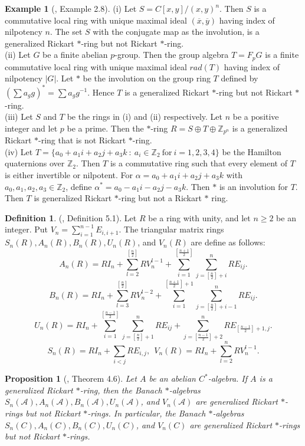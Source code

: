 \documentclass[11pt, one side,emlines]{amsart}
\newtheorem{proposition}[lemma]{Proposition}
\theoremstyle{definition}
\newtheorem{example}[lemma]{Example}
\newtheorem{definition}[lemma]{Definition}
\numberwithin{equation}{section} \thispagestyle{empty} \voffset
\begin{document}
 \begin{example} [\cite{ahmadigen2021}, Example 2.8]
 	(i) Let $S = C[x, y]/(x, y)^n$. Then $S$ is a commutative local ring with unique maximal ideal $(\overline x, \overline y)$
 	having index of nilpotency $n$. The set $S$ with the conjugate map as the involution, is a generalized Rickart $*$-ring but not Rickart $*$-ring.\\
 	(ii) Let $G$ be a finite abelian $p$-group. Then the group algebra $T = F_pG$ is a finite commutative local
 	ring with unique maximal ideal $rad(T)$ having index of nilpotency $|G|$. Let $*$ be the involution on the group ring $T$ defined by $(\sum a_gg)^* = \sum a_gg^{-1}$. Hence $T$ is a generalized Rickart $*$-ring but not Rickart $*$-ring.\\
 	(iii) Let $S$ and $T$ be the rings in (i) and (ii) respectively. Let $n$ be a positive integer and let $p$ be 	a prime. Then the $*$-ring $R = S \oplus T \oplus \mathbb Z_{p^n}$ is a generalized Rickart $*$-ring that is not Rickart $*$-ring.\\
 	(iv) Let $T=\{a_0+a_1i+a_2j+a_3k ~:~ a_i\in \mathbb Z_2~\text{for}~ i=1,2,3,4\}$ be the Hamilton quaternions over $\mathbb Z_2$. Then $T$ is a commutative ring such that every element of $T$ is either invertible or nilpotent.
 	For $\alpha=a_0+a_1i+a_2j+a_3k$ with $a_0,a_1,a_2,a_3\in \mathbb Z_2$, define $\alpha^*=a_0-a_1i-a_2j-a_3k$. Then $*$ is an involution for $T$. Then $T$ is generalized Rickart $*$-ring but not a Rickart $*$ ring.
 \end{example}
 
  \begin{definition}
  	(\cite{ahmadiquasi2020}, Definition 5.1). Let $R$ be a ring with unity, and let $n \geq 2$ be an integer. Put $V_n = \sum_{i=1}^{n-1}E_{i,i+1}$.
  	The triangular matrix rings $S_n(R), A_n(R), B_n(R), U_n(R)$, and $V_n(R)$ are define as follows:
  	$$A_n(R)=RI_n+\displaystyle \sum_{l=2}^{[\frac{n}{2}]}RV_n^{l-1}+\sum_{i=1}^{[\frac{n+1}{2}]}\sum_{j=[\frac{n}{2}]+i}^{n}RE_{ij}.$$
  	$$B_n(R)=RI_n+\displaystyle \sum_{l=3}^{[\frac{n}{2}]}RV_n^{l-2}+\sum_{i=1}^{[\frac{n+1}{2}]+1}\sum_{j=[\frac{n}{2}]+i-1}^{n}RE_{ij}.$$
  	$$U_n(R)=RI_n+\displaystyle \sum_{i=1}^{[\frac{n-1}{2}]}\sum_{j=[\frac{n}{2}]+1}^{n}RE_{ij}+\sum_{j=[\frac{n-1}{2}]+2}^{n}RE_{[\frac{n-1}{2}]+1,j}.$$
  	$$S_n(R)=RI_n+\displaystyle \sum_{i<j}RE_{i,j}, ~~ V_n(R)=RI_n+\displaystyle \sum_{l=2}^nRV_n^{l-1}.$$
  \end{definition}
  
  \begin{proposition} [\cite{ahmadigen2021}, Theorem 4.6] 
  	Let $A$ be an abelian $C^*$-algebra. If $A$ is a generalized Rickart $*$-ring, then the Banach $*$-algebras $S_n(\mathcal A), A_n(\mathcal A), B_n(\mathcal A), U_n(\mathcal A)$, and $V_n(\mathcal A)$ are generalized Rickart $*$-rings but not Rickart
  	$*$-rings. In particular, the Banach $*$-algebras $S_n(C), A_n(C), B_n(C), U_n(C)$, and $V_n(C)$ are generalized
  	Rickart $*$-rings but not Rickart $*$-rings.
  \end{proposition}
  
\end{document}
